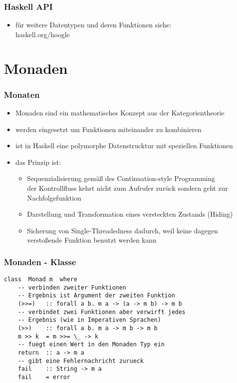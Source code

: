 \begin{frame}[fragile]
\frametitle{Haskell API}
\begin{itemize}
\item für weitere Datentypen und deren Funktionen siehe:\\
haskell.org/hoogle
\end{itemize}
\end{frame}

\section{Monaden}
\begin{frame}
\frametitle{Monaten}
\begin{itemize}
\item Monaden sind ein mathematisches Konzept aus der Kategorientheorie
\item werden eingesetzt um Funktionen miteinander zu kombinieren 
\item ist in Haskell eine polymorphe Datenstrucktur mit speziellen Funktionen
\item das Prinzip ist:
\begin{itemize}
\item Sequenzialisierung gemäß des Continuation-style Programming \\
	der Kontrollfluss kehrt nicht zum Aufrufer zurück sondern geht zur Nachfolgefunktion 
\item Darstellung und Transformation eines versteckten Zustands (Hiding)
\item Sicherung von Single-Threadedness dadurch, weil keine dagegen verstoßende Funktion benutzt werden kann
\end{itemize}
\end{itemize}
\end{frame}

\begin{frame}[fragile]
\frametitle{Monaden - Klasse}
\begin{lstlisting}
class  Monad m  where
    -- verbinden zweiter Funktionen
    -- Ergebnis ist Argument der zweiten Funktion
    (>>=)   :: forall a b. m a -> (a -> m b) -> m b
    -- verbindet zwei Funktionen aber verwirft jedes 
    -- Ergebnis (wie in Imperativen Sprachen)
    (>>)    :: forall a b. m a -> m b -> m b
    m >> k  = m >>= \_ -> k
    -- fuegt einen Wert in den Monaden Typ ein
    return  :: a -> m a
    -- gibt eine Fehlernachricht zurueck
    fail    :: String -> m a
    fail    = error
\end{lstlisting}	
\end{frame}

